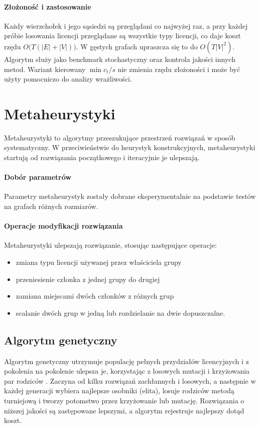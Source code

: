 \paragraph{Złożoność i zastosowanie}
Każdy wierzchołek i jego sąsiedzi są przeglądani co najwyżej raz, a przy każdej próbie losowania licencji przeglądane są wszystkie typy licencji, co daje koszt rzędu \(O\bigl(T(|E|+|V|)\bigr)\).
W gęstych grafach upraszcza się to do \(O(T|V|^2)\).
Algorytm służy jako benchmark stochastyczny oraz kontrola jakości innych metod.
Wariant kierowany \(\min c_t/s\) nie zmienia rzędu złożoności i może być użyty pomocniczo do analizy wrażliwości.


\section{Metaheurystyki}

Metaheurystyki to algorytmy przeszukujące przestrzeń rozwiązań w sposób systematyczny. W przeciwieństwie do heurystyk konstrukcyjnych, metaheurystyki startują od rozwiązania początkowego i iteracyjnie je ulepszają.

\paragraph{Dobór parametrów}
Parametry metaheurystyk zostały dobrane eksperymentalnie na podstawie testów na grafach różnych rozmiarów.

\paragraph{Operacje modyfikacji rozwiązania}
Metaheurystyki ulepszają rozwiązanie, stosując następujące operacje:
\begin{itemize}
  \item zmiana typu licencji używanej przez właściciela grupy
  \item przeniesienie członka z jednej grupy do drugiej
  \item zamiana miejscami dwóch członków z różnych grup
  \item scalanie dwóch grup w jedną lub rozdzielanie na dwie dopuszczalne.
\end{itemize}

\subsection{Algorytm genetyczny}\label{subsec:ga}
Algorytm genetyczny utrzymuje populację pełnych przydziałów licencyjnych i z pokolenia na pokolenie ulepsza je, korzystając z losowych mutacji i krzyżowania par rodziców \cite{holland1975,goldberg1989}. Zaczyna od kilku rozwiązań zachłannych i losowych, a następnie w każdej generacji wybiera najlepsze osobniki (elita), losuje rodziców metodą turniejową i tworzy potomstwo przez krzyżowanie lub mutację. Rozwiązania o niższej jakości są zastępowane lepszymi, a algorytm rejestruje najlepszy dotąd koszt.


